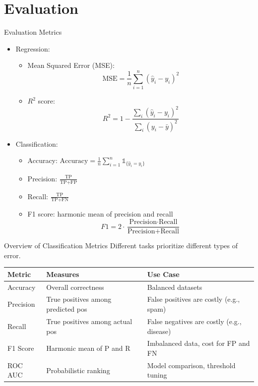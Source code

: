 \documentclass[aspectratio=169]{beamer}
\begin{document}
\section{Evaluation}
\label{sec:org236ad27}
\begin{frame}[label={sec:org5328148}]{Evaluation Metrics}
\begin{itemize}
\item \alert{Regression}:
\begin{itemize}
\item Mean Squared Error (MSE): 
\[
    \text{MSE} = \frac{1}{n} \sum_{i=1}^n (\hat{y}_i - y_i)^2
    \]
\item \(R^2\) score:
\[
    R^2 = 1 - \frac{\sum_i (\hat{y}_i - y_i)^2}{\sum_i (y_i - \bar{y})^2}
    \]
\end{itemize}

\item \alert{Classification}:
\begin{itemize}
\item Accuracy: \(\text{Accuracy} = \frac{1}{n} \sum_{i=1}^n \mathds{1}_{\{\hat{y}_i = y_i\}}\)
\item Precision: \(\frac{\text{TP}}{\text{TP} + \text{FP}}\)
\item Recall: \(\frac{\text{TP}}{\text{TP} + \text{FN}}\)
\item F1 score: harmonic mean of precision and recall
\[
    F1 = 2 \cdot \frac{\text{Precision} \cdot \text{Recall}}{\text{Precision} + \text{Recall}}
    \]
\end{itemize}
\end{itemize}
\end{frame}


\begin{frame}[label={sec:org5de2fae}]{Overview of Classification Metrics}
Different tasks prioritize different types of error.

\begin{center}
\begin{tabular}{lll}
Metric & Measures & Use Case\\[0pt]
\hline
Accuracy & Overall correctness & Balanced datasets\\[0pt]
Precision & True positives among predicted pos & False positives are costly (e.g., spam)\\[0pt]
Recall & True positives among actual pos & False negatives are costly (e.g., disease)\\[0pt]
F1 Score & Harmonic mean of P and R & Imbalanced data, cost for FP and FN\\[0pt]
ROC AUC & Probabilistic ranking & Model comparison, threshold tuning\\[0pt]
\end{tabular}
\end{center}
\end{frame}
\end{document}
